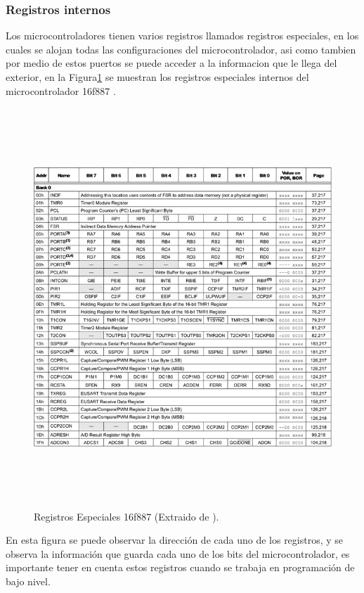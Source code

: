 \documentclass[12pt,a4paper]{article}
\begin{document}
   \subsubsection{Registros internos}
   Los microcontroladores tienen varios registros llamados registros especiales, en los cuales se alojan todas las configuraciones del microcontrolador, asi como tambien por medio de estos puertos se puede acceder a la informacion que le llega del exterior, en la Figura\ref{fig:Registros} se muestran los registros especiales internos del microcontrolador 16f887 \cite{PIC}.
   
   \begin{figure}[htpb]
   \centering
   \includegraphics[height=15cm]{Registros}
   \caption{Registros Especiales 16f887 (Extraido de \cite{PIC}).}
   \label{fig:Registros}
   \end{figure}
   
   En esta figura se puede observar la dirección de cada uno de los registros, y se observa la información que guarda cada uno de los bits del microcontrolador, es importante tener en cuenta estos registros cuando se trabaja en programación de bajo nivel.
   
\end{document}
